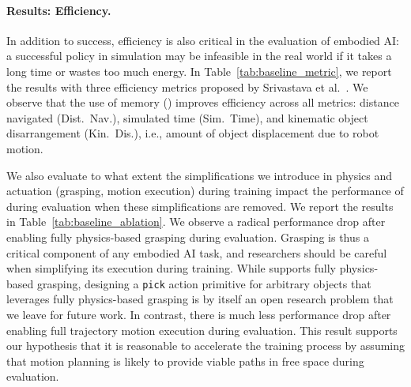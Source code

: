 \paragraph{Results: Efficiency.} In addition to success, efficiency is also critical in the evaluation of embodied AI: a successful policy in simulation may be infeasible in the real world if it takes a long time or wastes too much energy. In Table~\ref{tab:baseline_metric}, we report the results with three efficiency metrics proposed by Srivastava et al.~\cite{srivastava2021behavior}. We observe that the use of memory (\rlprimhist) improves efficiency across all metrics: distance navigated (Dist.~Nav.), simulated time (Sim.~Time), and kinematic object disarrangement (Kin.~Dis.), i.e., amount of object displacement due to robot motion.%

We also evaluate to what extent the simplifications we introduce in physics and actuation (grasping, motion execution) during training impact the performance of \rlprim during evaluation when these simplifications are removed. We report the results in Table~\ref{tab:baseline_ablation}. 
We observe a radical performance drop after enabling fully physics-based grasping during evaluation. Grasping is thus a critical component of any embodied AI task, and researchers should be careful when simplifying its execution during training. While \simulator supports fully physics-based grasping,  designing a \texttt{pick} action primitive for arbitrary objects that leverages fully physics-based grasping is by itself an open research problem that we leave for future work. In contrast, there is much less performance drop after enabling full trajectory motion execution during evaluation. This result supports our hypothesis that it is reasonable to accelerate the training process by assuming that motion planning is likely to provide viable paths in free space during evaluation.

